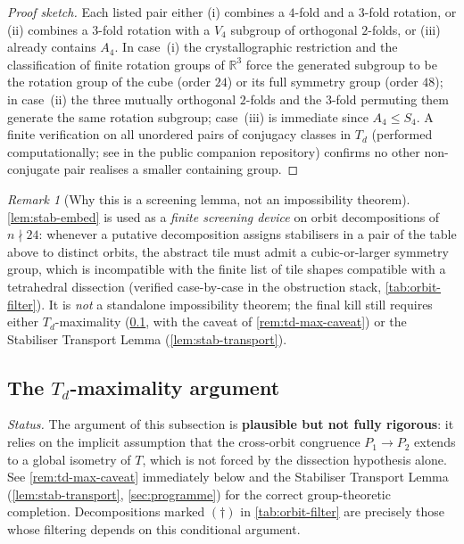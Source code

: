 \documentclass[11pt,a4paper]{article}
\theoremstyle{plain}
\theoremstyle{definition}
\theoremstyle{remark}
\newtheorem{remark}[remark]{Remark}
\newcommand{\Td}{T_{\!d}}
\newcommand{\R}{\mathbb{R}}
\begin{document}
\begin{proof}[Proof sketch]
Each listed pair either (i) combines a $4$-fold and a $3$-fold rotation,
or (ii) combines a $3$-fold rotation with a $V_{4}$ subgroup of orthogonal
$2$-folds, or (iii) already contains $A_{4}$.  In case~(i) the
crystallographic restriction and the classification of finite rotation
groups of $\R^{3}$ force the generated subgroup to be the rotation group
of the cube (order $24$) or its full symmetry group (order $48$); in
case~(ii) the three mutually orthogonal $2$-folds and the $3$-fold
permuting them generate the same rotation subgroup; case~(iii) is
immediate since $A_{4} \leq S_{4}$.  A finite verification on all unordered
pairs of conjugacy classes in $\Td$ (performed computationally; see
 in the public companion repository)
confirms no other non-conjugate pair realises a smaller containing group.
\end{proof}

\begin{remark}[Why this is a screening lemma, not an impossibility theorem]
\label{rem:stab-screen}
\cref{lem:stab-embed} is used as a \emph{finite screening device} on orbit
decompositions of $n \nmid 24$: whenever a putative decomposition assigns
stabilisers in a pair of the table above to distinct orbits, the abstract
tile must admit a cubic-or-larger symmetry group, which is incompatible
with the finite list of tile shapes compatible with a tetrahedral
dissection (verified case-by-case in the obstruction stack,
\cref{tab:orbit-filter}).  It is \emph{not} a standalone impossibility
theorem; the final kill still requires either $\Td$-maximality
(\cref{ssec:td-max}, with the caveat of \cref{rem:td-max-caveat}) or the
Stabiliser Transport Lemma (\cref{lem:stab-transport}).
\end{remark}

\subsection{The \texorpdfstring{$\Td$}{Td}-maximality argument}\label{ssec:td-max}

\noindent\emph{Status.}  The argument of this subsection is \textbf{plausible
but not fully rigorous}: it relies on the implicit assumption that the
cross-orbit congruence $P_{1} \to P_{2}$ extends to a global isometry of
$T$, which is not forced by the dissection hypothesis alone.  See
\cref{rem:td-max-caveat} immediately below and the Stabiliser Transport
Lemma (\cref{lem:stab-transport}, \cref{sec:programme}) for the correct
group-theoretic completion.  Decompositions marked $(\dagger)$ in
\cref{tab:orbit-filter} are precisely those whose filtering depends on
this conditional argument.
\end{document}
